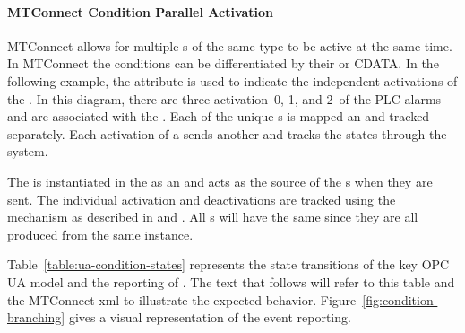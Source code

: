 \FloatBarrier

\paragraph{MTConnect Condition Parallel Activation}

MTConnect allows for multiple s of the same type to be active at the same time. In MTConnect the conditions can be differentiated by their  or \gls{CDATA}. In the following example, the attribute  is used to indicate the independent activations of the . In this diagram, there are three activation--0, 1, and 2--of the PLC alarms and are associated with the . Each of the unique s is mapped an   and tracked separately. Each activation of a  sends another  and tracks the states through the  system.

The  is instantiated in the  as an  and acts as the source of the s when they are sent. The individual activation and deactivations are tracked using the  mechanism as described in \cite{UAPart3} and \cite{UAPart4}. All s will have the same  since they are all produced from the same  instance.

Table~\ref{table:ua-condition-states} represents the state transitions of the key OPC UA  model and the reporting of . The text that follows will refer to this table and the MTConnect \gls{xml} to illustrate the expected behavior. Figure~\ref{fig:condition-branching} gives a visual representation of the event reporting.

